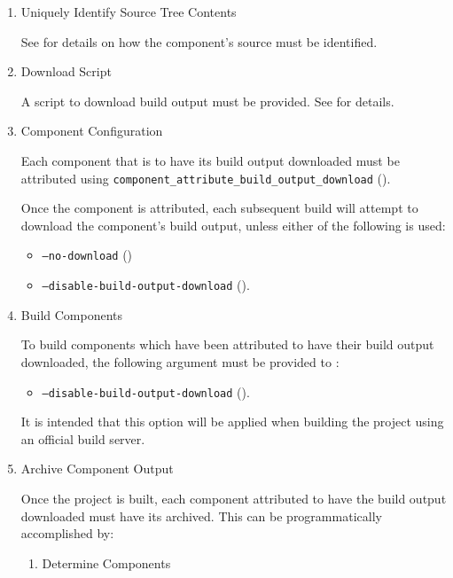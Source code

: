 \begin{enumerate}
\item{Uniquely Identify Source Tree Contents}

  See  for details on how the
  component's source must be identified.

\item{Download Script}

  A script to download build output must be provided.  See
   for details.

\item{Component Configuration}

 Each component that is to have its build output downloaded must be
 attributed using
 \texttt{component\_attribute\_build\_output\_download}
 ().

 Once the component is attributed, each subsequent build will attempt
 to download the component's build output, unless either of the
 following is used:

 \begin{itemize}
 \item \texttt{--no-download} ()
 \item \texttt{--disable-build-output-download}
   ().
 \end{itemize}

\item{Build Components}

  To build components which have been attributed to have their build
  output downloaded, the following argument must be provided to
  \lmsbwcmd:

 \begin{itemize}
 \item \texttt{--disable-build-output-download}
   ().
 \end{itemize}

 It is intended that this option will be applied when building the
 project using an official build server.

\item{Archive Component Output}

  Once the project is built, each component attributed to have the
  build output downloaded must have its \destdir archived.  This can
  be programmatically accomplished by:

  \begin{enumerate}
    \item{Determine Components}


\end{enumerate}
\end{enumerate}
